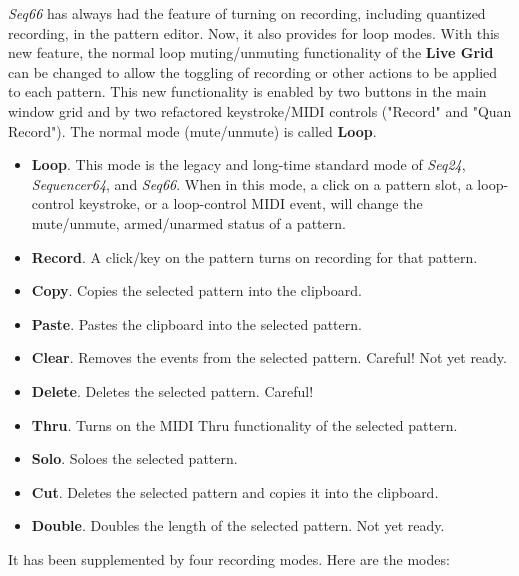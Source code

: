   \textsl{Seq66} has always had the feature of turning on recording, including
   quantized recording, in the pattern editor.
   Now, it also provides for
   loop modes.  With this new feature, the normal loop muting/unmuting
   functionality of the \textbf{Live Grid} can be changed to allow the toggling
   of recording or other actions to be applied to each pattern.
   This new functionality is enabled by two buttons in the main window grid and
   by two refactored keystroke/MIDI controls ("Record" and "Quan Record").
   The normal mode (mute/unmute) is called \textbf{Loop}.

   \begin{itemize}
      \item \textbf{Loop}.
         This mode is the legacy and long-time standard mode of
         \textsl{Seq24}, \textsl{Sequencer64}, and \textsl{Seq66}.
         When in this mode, a click on a pattern slot, a loop-control
         keystroke, or a loop-control MIDI event, will change the mute/unmute,
         armed/unarmed status of a pattern.
      \item \textbf{Record}.
         A click/key on the pattern turns on recording for that pattern.
      \item \textbf{Copy}.
         Copies the selected pattern into the clipboard.
      \item \textbf{Paste}.
         Pastes the clipboard into the selected pattern.
      \item \textbf{Clear}.
         Removes the events from the selected pattern.  Careful!
         Not yet ready.
      \item \textbf{Delete}.
         Deletes the selected pattern.  Careful!
      \item \textbf{Thru}.
         Turns on the MIDI Thru functionality of the selected pattern.
      \item \textbf{Solo}.
         Soloes the selected pattern.
      \item \textbf{Cut}.
         Deletes the selected pattern and copies it into the clipboard.
      \item \textbf{Double}.
         Doubles the length of the selected pattern.
         Not yet ready.
   \end{itemize}
   It has been supplemented by four recording modes.
   Here are the modes:

